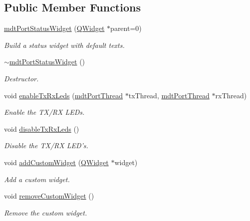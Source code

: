 \subsection*{Public Member Functions}
\begin{DoxyCompactItemize}
\item 
\hyperlink{classmdt_port_status_widget_ac92d61928204f88704de3f597d5754c7}{mdt\-Port\-Status\-Widget} (\hyperlink{class_q_widget}{Q\-Widget} $\ast$parent=0)
\begin{DoxyCompactList}\small\item\em Build a status widget with default texts. \end{DoxyCompactList}\item 
\hyperlink{classmdt_port_status_widget_a239dbbcdc412d2cd332c665a55ecfa9b}{$\sim$mdt\-Port\-Status\-Widget} ()
\begin{DoxyCompactList}\small\item\em Destructor. \end{DoxyCompactList}\item 
void \hyperlink{classmdt_port_status_widget_a8e87596be48b5cfda6703c42655b2f25}{enable\-Tx\-Rx\-Leds} (\hyperlink{classmdt_port_thread}{mdt\-Port\-Thread} $\ast$tx\-Thread, \hyperlink{classmdt_port_thread}{mdt\-Port\-Thread} $\ast$rx\-Thread)
\begin{DoxyCompactList}\small\item\em Enable the T\-X/\-R\-X L\-E\-Ds. \end{DoxyCompactList}\item 
void \hyperlink{classmdt_port_status_widget_af57ccc9a560d8ae1a49bc57a774a7db7}{disable\-Tx\-Rx\-Leds} ()
\begin{DoxyCompactList}\small\item\em Disable the T\-X/\-R\-X L\-E\-D's. \end{DoxyCompactList}\item 
void \hyperlink{classmdt_port_status_widget_ac14c1207abd242248538815542cb9068}{add\-Custom\-Widget} (\hyperlink{class_q_widget}{Q\-Widget} $\ast$widget)
\begin{DoxyCompactList}\small\item\em Add a custom widget. \end{DoxyCompactList}\item 
void \hyperlink{classmdt_port_status_widget_a108227f8f64dd69edd2dcdca2b52b8a0}{remove\-Custom\-Widget} ()
\begin{DoxyCompactList}\small\item\em Remove the custom widget. \end{DoxyCompactList}\item 

\end{DoxyCompactItemize}
